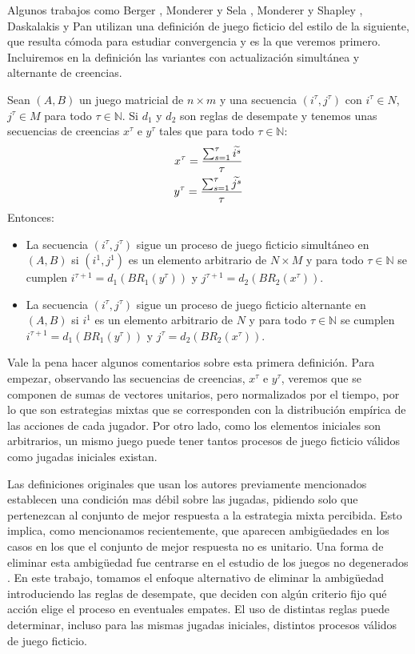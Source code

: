 Algunos trabajos como Berger \cite{browns:original}, Monderer y Sela \cite{no:cycling, 2x2:without}, Monderer y Shapley \cite{identical:interests}, Daskalakis y Pan \cite{counter:karlin:strong} utilizan una definición de juego ficticio del estilo de la siguiente, que resulta cómoda para estudiar convergencia y es la que veremos primero. Incluiremos en la definición las variantes con actualización simultánea y alternante de creencias.

\begin{definition} \label{def:fp:berger}
    Sean $(A, B)$ un juego matricial de $n \times m$ y una secuencia $(i^\tau, j^\tau)$ con $i^\tau \in N$, $j^\tau \in M$ para todo $\tau \in \mathbb{N}$. Si $d_1$ y $d_2$ son reglas de desempate y tenemos unas secuencias de creencias $x^\tau$ e $y^\tau$ tales que para todo $\tau \in \mathbb{N}$:
    \begin{gather*}
        x^\tau= \frac{\sum^\tau_{s=1} \widetilde{i^s}}{\tau}  \\
        y^\tau= \frac{\sum^\tau_{s=1} \widetilde{j^s}}{\tau}
    \end{gather*}
    Entonces:
    \begin{itemize}
        \item La secuencia $(i^\tau, j^\tau)$ sigue un proceso de juego ficticio simultáneo en $(A, B)$ si $(i^1, j^1)$ es un elemento arbitrario de $N \times M$ y para todo $\tau \in \mathbb{N}$ se cumplen $i^{\tau+1} = d_1(BR_1(y^\tau))$ y $j^{\tau+1} = d_2(BR_2(x^\tau))$.
        \item La secuencia $(i^\tau, j^\tau)$ sigue un proceso de juego ficticio alternante en $(A, B)$ si $i^1$ es un elemento arbitrario de $N$ y para todo $\tau \in \mathbb{N}$ se cumplen $i^{\tau+1} = d_1(BR_1(y^\tau))$ y $j^{\tau} = d_2(BR_2(x^\tau))$.
    \end{itemize}
\end{definition}

Vale la pena hacer algunos comentarios sobre esta primera definición. Para empezar, observando las secuencias de creencias, $x^\tau$ e $y^\tau$, veremos que se componen de sumas de vectores unitarios, pero normalizados por el tiempo, por lo que son estrategias mixtas que se corresponden con la distribución empírica de las acciones de cada jugador. Por otro lado, como los elementos iniciales son arbitrarios, un mismo juego puede tener tantos procesos de juego ficticio válidos como jugadas iniciales existan.

Las definiciones originales que usan los autores previamente mencionados establecen una condición mas débil sobre las jugadas, pidiendo solo que pertenezcan al conjunto de mejor respuesta a la estrategia mixta percibida. Esto implica, como mencionamos recientemente, que aparecen ambigüedades en los casos en los que el conjunto de mejor respuesta no es unitario. Una forma de eliminar esta ambigüedad fue centrarse en el estudio de los juegos no degenerados \cite{browns:original}. En este trabajo, tomamos el enfoque alternativo de eliminar la ambigüedad introduciendo las reglas de desempate, que deciden con algún criterio fijo qué acción elige el proceso en eventuales empates. El uso de distintas reglas puede determinar, incluso para las mismas jugadas iniciales, distintos procesos válidos de juego ficticio.

